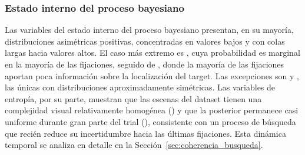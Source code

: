 \subsubsection{Estado interno del proceso bayesiano}

Las variables del estado interno del proceso bayesiano presentan, en su mayoría,
distribuciones asimétricas positivas, concentradas en valores bajos y con colas largas hacia valores altos. El caso más extremo es , cuya probabilidad es marginal en la mayoría
de las fijaciones, seguido de , donde la mayoría de las
fijaciones aportan poca información sobre la localización del target. Las excepciones son  y
, las únicas con distribuciones aproximadamente
simétricas. Las variables de entropía, por su parte, muestran que las escenas del
dataset tienen una complejidad visual relativamente homogénea
() y que la posterior permanece casi uniforme
durante gran parte del trial (), consistente con un proceso
de búsqueda que recién reduce su incertidumbre hacia las últimas fijaciones. Esta
dinámica temporal se analiza en detalle en la Sección~\ref{sec:coherencia_busqueda}.

\begin{table}[H]
\centering
\caption{Estadísticos descriptivos de las variables dinámicas del estado interno (parte I).}
\label{tab:dist_bayesiano_a}
\small
\setlength{\tabcolsep}{4pt}
\renewcommand{\arraystretch}{1.2}
\end{table}


